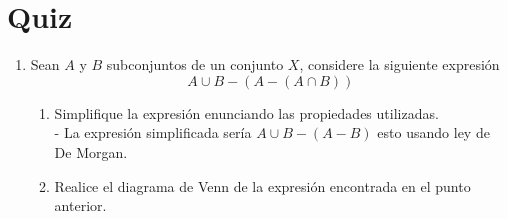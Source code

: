 \documentclass[11pt]{article}
\begin{document}
\section*{Quiz}
\begin{enumerate}
    \item Sean $A$ y $B$ subconjuntos de un conjunto $X$, considere la siguiente expresión
        $$
        A \cup B-(A-(A \cap B))
        $$
        \begin{enumerate}
            \item Simplifique la expresión enunciando las propiedades utilizadas.\\
                - La expresión simplificada sería $A \cup B - (A - B)$ esto usando ley de De Morgan.
            \item Realice el diagrama de Venn de la expresión encontrada en el punto anterior.
                \begin{center}


\end{center}
\end{enumerate}
\end{enumerate}
\end{document}
